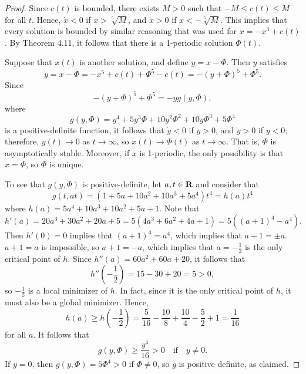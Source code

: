 \documentclass[nonumber]{homework}
\begin{document}
	\begin{proof}
		Since $c(t)$ is bounded, there exists $M > 0$ such that $-M \le c(t) \le M$ for all $t$. Hence, $\dot{x} < 0$ if $x > \sqrt[5]{M}$, and $\dot{x} > 0$ if $x < -\sqrt[5]{M}$. This implies that every solution is bounded by similar reasoning that was used for $\dot{x} = -x^3 + c(t)$. By Theorem 4.11, it follows that there is a 1-periodic solution $\Phi(t)$.
		
		Suppose that $x(t)$ is another solution, and define $y = x - \Phi$. Then $y$ satisfies
		\begin{equation*}
			\dot{y} = \dot{x} - \dot{\Phi} = -x^5 + c(t) + \Phi^5 - c(t) = -(y+\Phi)^5 + \Phi^5.
		\end{equation*}
		Since
		\begin{equation*}
			-(y+\Phi)^5 + \Phi^5 = -yg(y,\Phi),
		\end{equation*}
		where
		\begin{equation*}
			g(y,\Phi) = y^4 + 5y^3\Phi + 10y^2\Phi^2 + 10y\Phi^3 + 5\Phi^4
		\end{equation*}
		is a positive-definite function, it follows that $\dot{y} < 0$ if $y > 0$, and $\dot{y} > 0$ if $y< 0$; therefore, $y(t)\to 0$ as $t\to \infty$, so $x(t) \to \Phi(t)$ as $t \to \infty$. That is, $\Phi$ is asymptotically stable. Moreover, if $x$ is 1-periodic, the only possibility is that $x = \Phi$, so $\Phi$ is unique.
		
		To see that $g(y,\Phi)$ is positive-definite, let $a,t \in \textnormal{\bf R}$ and consider that
		\begin{equation*}
			g(t,at) = (1 + 5a + 10a^2 + 10a^3 + 5a^4)t^4 = h(a)t^4
		\end{equation*}
		where $h(a) = 5a^4 + 10a^3 + 10a^2 + 5a+1$. Note that
		\begin{equation*}
			h'(a) = 20a^3 + 30a^2 + 20a + 5 = 5(4a^3 + 6 a^2 + 4a + 1) =5\left((a+1)^4 - a^4\right).
		\end{equation*}
		Then $h'(0) = 0$ implies that $(a+1)^4 = a^4$, which implies that $a + 1 = \pm a$. $a + 1 = a$ is impossible, so $a + 1 = -a$, which implies that $a = -\frac{1}{2}$ is the only critical point of $h$. Since $h''(a) = 60a^2 + 60a + 20$, it follows that
		\begin{equation*}
			h''\left(-\frac{1}{2}\right) = 15 - 30 + 20 = 5 > 0,
		\end{equation*}
		so $-\frac{1}{2}$ is a local minimizer of $h$. In fact, since it is the only critical point of $h$, it must also be a global minimizer. Hence,
		\begin{equation*}
			h(a) \ge h\left(-\frac{1}{2}\right) = \frac{5}{16} - \frac{10}{8} + \frac{10}{4} - \frac{5}{2} + 1 = \frac{1}{16}
		\end{equation*}
		for all $a$. It follows that
		\begin{equation*}
			g(y,\Phi) \ge \frac{y^4}{16} > 0 \quad \text{if}\quad y \ne 0.
		\end{equation*}
		If $y = 0$, then $g(y,\Phi) = 5\Phi^4 > 0$ if $\Phi \ne 0$, so $g$ is positive definite, as claimed.
	\end{proof}
\end{document}
